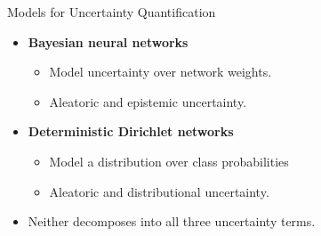 \begin{frame}{Models for Uncertainty Quantification}
\label{frm:model-components}
\begin{itemize}
\setlength{\itemsep}{6mm}
\item \textbf{Bayesian neural networks}
\begin{itemize}
\item Model uncertainty over network weights.    
\item Aleatoric and epistemic uncertainty. %
\end{itemize}
\item \textbf{Deterministic Dirichlet networks}
\begin{itemize}
\item Model a distribution over class probabilities %
\item Aleatoric and distributional uncertainty.
\end{itemize}
\item Neither decomposes into all three uncertainty terms.
\end{itemize}
\end{frame}

